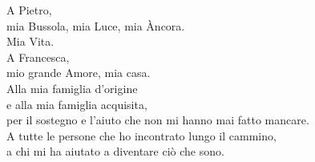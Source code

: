 \cleardoublepage
\thispagestyle{empty}

\vspace*{\fill}

\begin{flushright}
\begin{minipage}{0.58\textwidth}
\itshape

A Pietro,\\
mia Bussola, mia Luce, mia Àncora.\\
Mia Vita.\\[0.2cm]

A Francesca,\\
mio grande Amore, mia casa.\\[0.2cm]

Alla mia famiglia d'origine\\
e alla mia famiglia acquisita,\\
per il sostegno e l'aiuto che non mi hanno mai fatto mancare.\\[0.2cm]

A tutte le persone che ho incontrato lungo il cammino,\\
a chi mi ha aiutato a diventare ciò che sono.

\raggedleft
\end{minipage}
\end{flushright}

\vspace*{\fill}

\cleardoublepage
